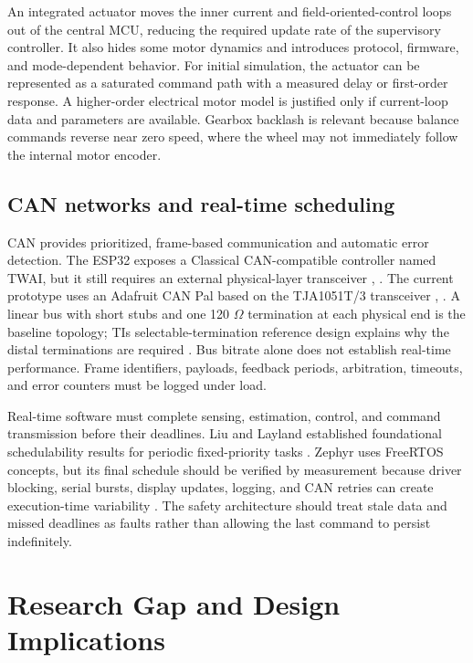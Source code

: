 An integrated actuator moves the inner current and
field-oriented-control loops out of the central MCU, reducing the
required update rate of the supervisory controller. It also hides some
motor dynamics and introduces protocol, firmware, and mode-dependent
behavior. For initial simulation, the actuator can be represented as a
saturated command path with a measured delay or first-order response. A
higher-order electrical motor model is justified only if current-loop
data and parameters are available. Gearbox backlash is relevant because
balance commands reverse near zero speed, where the wheel may not
immediately follow the internal motor encoder.

\subsection{CAN networks and real-time scheduling}\label{can-networks-and-real-time-scheduling}

CAN provides prioritized, frame-based communication and automatic error
detection. The ESP32 exposes a Classical CAN-compatible controller named
TWAI, but it still requires an external physical-layer transceiver
\cite{espressif2026esp32}, \cite{espressif2026twai}. The current prototype uses an Adafruit CAN Pal based
on the TJA1051T\slash{}3 transceiver \cite{nxp2026tja1051}, \cite{adafruit2026canpal}. A linear bus with
short stubs and one 120 \ensuremath{\Omega} termination at each physical end is the
baseline topology; TI\textquotesingle s selectable-termination reference
design explains why the distal terminations are required \cite{ti2026tida01238}. Bus
bitrate alone does not establish real-time performance. Frame
identifiers, payloads, feedback periods, arbitration, timeouts, and
error counters must be logged under load.

Real-time software must complete sensing, estimation, control, and
command transmission before their deadlines. Liu and Layland established
foundational schedulability results for periodic fixed-priority tasks
\cite{liu1973scheduling}. Zephyr uses FreeRTOS concepts, but its final schedule should
be verified by measurement because driver blocking, serial bursts,
display updates, logging, and CAN retries can create execution-time
variability \cite{freertos2026scheduling}. The safety architecture should treat stale data
and missed deadlines as faults rather than allowing the last command to
persist indefinitely.

\section{Research Gap and Design Implications}\label{research-gap-and-design-implications}

